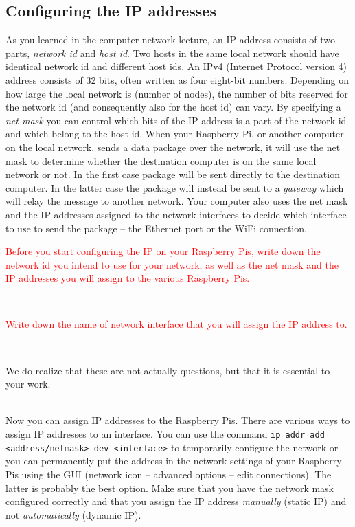 \documentclass{article}
\begin{document}
\subsection{Configuring the IP addresses}
As you learned in the computer network lecture, an IP address consists of two parts, \emph{network id} and \emph{host id}. Two hosts in the same local network should have identical network id and different host ids. An IPv4 (Internet Protocol version 4) address consists of 32 bits, often written as four eight-bit numbers. Depending on how large the local network is (number of nodes), the number of bits reserved for the network id (and consequently also for the host id) can vary. By specifying a \emph{net mask} you can control which bits of the IP address is a part of the network id and which belong to the host id. When your Raspberry Pi, or another computer on the local network, sends a data package over the network, it will use the net mask to determine whether the destination computer is on the same local network or not. In the first case package will be sent directly to the destination computer. In the latter case the package will instead be sent to a \emph{gateway} which will relay the message to another network. Your computer also uses the net mask and the IP addresses assigned to the network interfaces to decide which interface to use to send the package -- the Ethernet port or the WiFi connection.\\

\parbox[t]{14cm}{\textcolor{red}{Before you start configuring the IP on your Raspberry Pis, write down the network id you intend to use for your network, as well as the net mask and the IP addresses you will assign to the various Raspberry Pis.}}\\

\parbox[t]{14cm}{\textcolor{red}{Write down the name of network interface that you will assign the IP address to.}}\\

\parbox[t]{14cm}{We do realize that these are not actually questions, but that it is essential to your work.}\\

\noindent Now you can assign IP addresses to the Raspberry Pis. There are various ways to assign IP addresses to an interface.
You can use the command \verb!ip addr add <address/netmask> dev <interface>! to temporarily configure the network or you can permanently put the address in the network settings of your Raspberry Pis using the GUI (network icon -- advanced options -- edit connections). The latter is probably the best option. Make sure that you have the network mask configured correctly and that you assign the IP address \emph{manually} (static IP) and not \emph{automatically} (dynamic IP).
\end{document}

